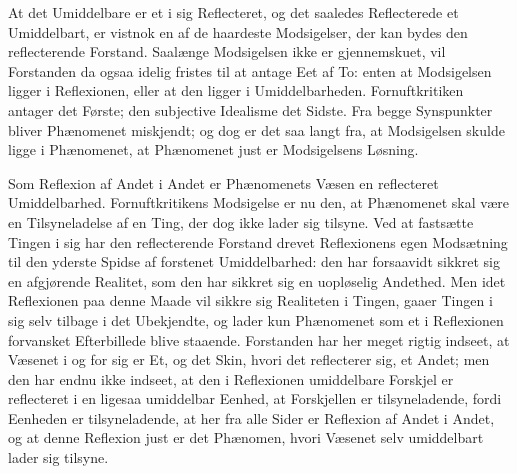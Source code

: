 \documentclass[11pt]{book}
\newcommand{\opage}[1]{\marginnote{\footnotesize\textit{[#1]}}}
\begin{document}
At det Umiddelbare er et i sig Reflecteret, og det saaledes Reflecterede et Umiddelbart, er vistnok en af de haardeste Modsigelser, der kan bydes den reflecterende Forstand. Saalænge Modsigelsen ikke er gjennemskuet, vil Forstanden da ogsaa idelig fristes til at antage Eet af To: enten at Modsigelsen ligger i Reflexionen, eller at den ligger i Umiddelbarheden. Fornuftkritiken antager det Første; den subjective Idealisme det Sidste. Fra begge Synspunkter bliver Phænomenet miskjendt; og dog er det saa langt fra, at Modsigelsen skulde ligge i Phænomenet, at Phænomenet just er Modsigelsens Løsning.

\opage{82} \setcounter{footnote}{0}%
Som Reflexion af Andet i Andet er Phænomenets Væsen
en reflecteret Umiddelbarhed. Fornuftkritikens Modsigelse er
nu den, at Phænomenet skal være en Tilsyneladelse af en
Ting, der dog ikke lader sig tilsyne. Ved at fastsætte Tingen
i sig har den reflecterende Forstand drevet Reflexionens egen
Modsætning til den yderste Spidse af forstenet Umiddelbarhed:
den har forsaavidt sikkret sig en afgjørende Realitet, som den
har sikkret sig en uopløselig Andethed. Men idet Reflexionen
paa denne Maade vil sikkre sig Realiteten i Tingen, gaaer
Tingen i sig selv tilbage i det Ubekjendte, og lader kun
Phænomenet som et i Reflexionen forvansket Efterbillede blive
staaende. Forstanden har her meget rigtig indseet, at Væsenet
i og for sig er Et, og det Skin, hvori det reflecterer sig, et
Andet; men den har endnu ikke indseet, at den i Reflexionen
umiddelbare Forskjel er reflecteret i en ligesaa umiddelbar
Eenhed, at Forskjellen er tilsyneladende, fordi Eenheden er
tilsyneladende, at her fra alle Sider er Reflexion af Andet i
Andet, og at denne Reflexion just er det Phænomen, hvori
Væsenet selv umiddelbart lader sig tilsyne.
\end{document}
